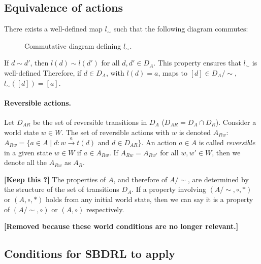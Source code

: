 \subsection{Equivalence of actions}

There exists a well-defined map $l_{\sim}$ such that the following diagram commutes:
\begin{figure}[H]
    
    \caption{Commutative diagram defining $l_{\sim}$.}
    \label{fig:Commutative_diagram_l}
\end{figure}

\begin{remark}
    If $d \sim d'$, then $l(d) \sim l(d')$ for all $d, d' \in D_{A}$.
    This property ensures that $l_{\sim}$ is well-defined
    Therefore, if $d \in D_{A}$, with $l(d)=a$, maps to $[d] \in D_{A}/\sim$, $l_{\sim}([d])=[a]$.
\end{remark}

\paragraph{Reversible actions.}
Let $D_{AR}$ be the set of reversible transitions in $D_{A}$ ($D_{AR}=D_{A} \cap D_{R}$).
Consider a world state $w \in W$.
The set of reversible actions with $w$ is denoted $A_{Rw}$: $A_{R w} = \{a \in A \mid d: w \xrightarrow{a} t(d) \text{ and } d \in D_{AR} \}$.
An action $a \in A$ is called \textit{reversible} in a given state $w \in W$ if $a \in A_{R w}$.
If $A_{Rw} = A_{Rw'}$ for all $w, w' \in W$, then we denote all the $A_{Rw}$ as $A_{R}$.

\textbf{[Keep this ?]}
The properties of $A$, and therefore of $A/\sim$, are determined by the structure of the set of transitions $D_{A}$.
If a property involving $(A/\sim, \circ, *)$ or $(A, \circ, *)$ holds from any initial world state, then we can say it is a property of $(A/\sim, \circ)$ or $(A, \circ)$ respectively.


\textbf{
[Removed because these world conditions are no longer relevant.]
}



\subsection{Conditions for SBDRL to apply}

